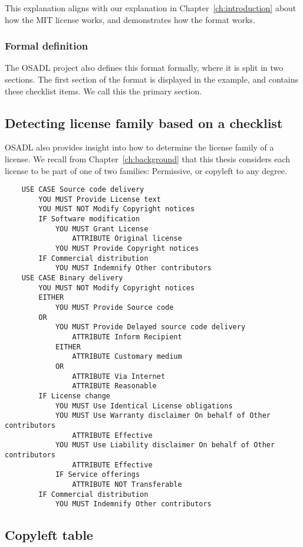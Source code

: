 This explanation aligns with our explanation in Chapter~\ref{ch:introduction} about how the MIT license works, and demonstrates how the format works. \\

\subsubsection{Formal definition}

The OSADL project also defines this format formally, where it is split in two sections. The first section of the format is displayed in the example, and contains these checklist items. We call this the primary section.



\subsection{Detecting license family based on a checklist}

OSADL also provides insight into how to determine the license family of a license. We recall from Chapter~\ref{ch:background} that this thesis considers each license to be part of one of two families: Permissive, or copyleft to any degree.


\begin{verbatim}
	USE CASE Source code delivery
		YOU MUST Provide License text
		YOU MUST NOT Modify Copyright notices
		IF Software modification
			YOU MUST Grant License
				ATTRIBUTE Original license
			YOU MUST Provide Copyright notices
		IF Commercial distribution
			YOU MUST Indemnify Other contributors
	USE CASE Binary delivery
		YOU MUST NOT Modify Copyright notices
		EITHER
			YOU MUST Provide Source code
		OR
			YOU MUST Provide Delayed source code delivery
				ATTRIBUTE Inform Recipient
			EITHER
				ATTRIBUTE Customary medium
			OR
				ATTRIBUTE Via Internet
				ATTRIBUTE Reasonable
		IF License change
			YOU MUST Use Identical License obligations
			YOU MUST Use Warranty disclaimer On behalf of Other contributors
				ATTRIBUTE Effective
			YOU MUST Use Liability disclaimer On behalf of Other contributors
				ATTRIBUTE Effective
			IF Service offerings
				ATTRIBUTE NOT Transferable
		IF Commercial distribution
			YOU MUST Indemnify Other contributors
\end{verbatim}

\subsection{Copyleft table}

